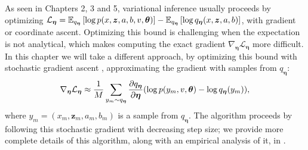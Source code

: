 As seen in Chapters 2, 3 and 5, variational inference usually proceeds by
optimizing $\mathcal{L}_{\bm \eta} = \mathbb{E}_{q_{\bm \eta}}\left[ \log p(x, \bm z, a,
  b, v, \bm \theta) \right] - \mathbb{E}_{q_{\bm \eta}}\left[ \log q_{\bm \eta}(x,
  \bm z, a, b) \right]$, with gradient or coordinate ascent.
Optimizing this bound is challenging when the expectation is not
analytical, which makes computing the exact gradient $\nabla_{\bm
  \eta} \mathcal{L}_{\bm \eta}$ more difficult.  In this chapter we
will take a different approach, by optimizing this
bound with stochastic gradient ascent
\citep{robbins:1951,bottou:2004}, approximating the gradient with
samples from $q_{\bm \eta}$:
\begin{align}
\nabla_{\bm \eta} \mathcal{L}_{\bm \eta}
  \approx \frac{1}{M} \sum_{y_m \sim q_{\bm \eta}}
    \frac{\partial q_{\bm \eta}}{\partial \bm \eta}( \log p(y_m, v, \bm \theta) - \log q_{\bm \eta}(y_m)
    ),
    \label{eq:approx_elbo_gradient}
\end{align}
where $y_m=(x_m, \bm z_m, a_m, b_m)$ is a sample from $q_{\bm
  \eta}$. The algorithm proceeds by following this stochastic gradient
with decreasing step size; we provide more complete details of this
algorithm, along with an empirical analysis of it, in
.



